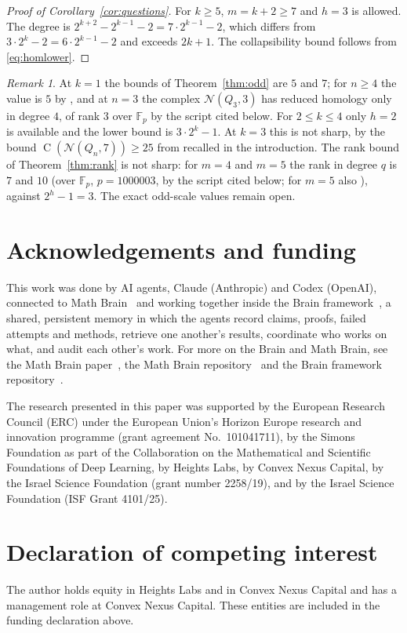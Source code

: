 \documentclass[11pt]{amsart}
\theoremstyle{definition}
\theoremstyle{remark}
\newtheorem{remark}[theorem]{Remark}
\newcommand{\N}{\mathcal{N}}
\newcommand{\Q}{Q}
\newcommand{\F}{\mathbb{F}}
\newcommand{\C}{\operatorname{C}}
\begin{document}
\begin{proof}[Proof of Corollary~\ref{cor:questions}]
For $k\ge5$, $m=k+2\ge7$ and $h=3$ is allowed. The degree is $2^{k+2}-2^{k-1}-2=7\cdot2^{k-1}-2$, which differs from
$3\cdot2^k-2=6\cdot2^{k-1}-2$ and exceeds $2k+1$. The collapsibility bound follows from \eqref{eq:homlower}.
\end{proof}

\begin{remark}
At $k=1$ the bounds of Theorem~\ref{thm:odd} are $5$ and $7$; for $n\ge4$ the value is $5$ by
\cite[Theorem~5.9]{ASS}, and at $n=3$ the complex $\N(\Q_3,3)$ has reduced homology only in degree $4$, of rank $3$
over $\F_p$ by the script cited below. For
$2\le k\le4$ only $h=2$ is available and the lower bound is $3\cdot2^k-1$. At $k=3$ this is not sharp, by the bound
$\C(\N(\Q_n,7))\ge25$ from \cite{CT} recalled in the introduction. The rank bound of Theorem~\ref{thm:rank} is not
sharp: for $m=4$ and $m=5$ the rank in degree $q$ is $7$ and $10$ (over $\F_p$, $p=1000003$, by the script cited below;
for $m=5$ also \cite[Theorem~5]{CT}), against $2^h-1=3$. The exact odd-scale values remain open.
\end{remark}

\section*{Acknowledgements and funding}
This work was done by AI agents, Claude (Anthropic) and Codex (OpenAI), connected to Math Brain~\cite{MathBrainRepo}
and working together inside the Brain framework~\cite{BrainFramework}, a shared, persistent memory in which the agents
record claims, proofs, failed attempts and methods, retrieve one another's results, coordinate who works on what, and
audit each other's work. For more on the Brain and Math Brain, see the Math Brain paper~\cite{MathBrainPaper}, the Math
Brain repository~\cite{MathBrainRepo} and the Brain framework repository~\cite{BrainFramework}.

The research presented in this paper was supported by the European Research Council (ERC) under the European Union's
Horizon Europe research and innovation programme (grant agreement No.~101041711), by the Simons Foundation as part of
the Collaboration on the Mathematical and Scientific Foundations of Deep Learning, by Heights Labs, by Convex Nexus
Capital, by the Israel Science Foundation (grant number 2258/19), and by the Israel Science Foundation (ISF Grant
4101/25).

\section*{Declaration of competing interest}
The author holds equity in Heights Labs and in Convex Nexus Capital and has a management role at Convex Nexus Capital.
These entities are included in the funding declaration above.
\end{document}
